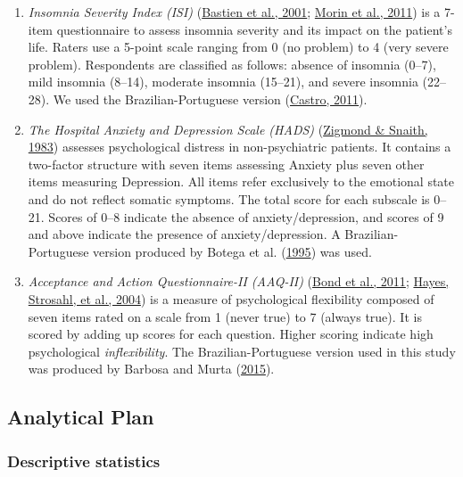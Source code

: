 \documentclass[
  ,doc,11pt, twoside,floatsintext]{apa6}
\begin{document}
\begin{enumerate}
\def\labelenumi{\arabic{enumi}.}
\item
  \emph{Insomnia Severity Index (ISI)} (\protect\hyperlink{ref-bastien2001}{Bastien et al., 2001}; \protect\hyperlink{ref-morin2011a}{Morin et al., 2011}) is a 7-item questionnaire to assess insomnia severity and its impact on the patient's life. Raters use a 5-point scale ranging from 0 (no problem) to 4 (very severe problem). Respondents are classified as follows: absence of insomnia (0--7), mild insomnia (8--14), moderate insomnia (15--21), and severe insomnia (22--28). We used the Brazilian-Portuguese version (\protect\hyperlink{ref-castro}{Castro, 2011}).
\item
  \emph{The Hospital Anxiety and Depression Scale (HADS)} (\protect\hyperlink{ref-zigmond1983hospital}{Zigmond \& Snaith, 1983}) assesses psychological distress in non-psychiatric patients. It contains a two-factor structure with seven items assessing Anxiety plus seven other items measuring Depression. All items refer exclusively to the emotional state and do not reflect somatic symptoms. The total score for each subscale is 0--21. Scores of 0--8 indicate the absence of anxiety/depression, and scores of 9 and above indicate the presence of anxiety/depression. A Brazilian-Portuguese version produced by Botega et al. (\protect\hyperlink{ref-botega1995transtornos}{1995}) was used.
\item
  \emph{Acceptance and Action Questionnaire-II (AAQ-II)} (\protect\hyperlink{ref-bond2011preliminary}{Bond et al., 2011}; \protect\hyperlink{ref-hayes2004measuring}{Hayes, Strosahl, et al., 2004}) is a measure of psychological flexibility composed of seven items rated on a scale from 1 (never true) to 7 (always true). It is scored by adding up scores for each question. Higher scoring indicate high psychological \emph{inflexibility}. The Brazilian-Portuguese version used in this study was produced by Barbosa and Murta (\protect\hyperlink{ref-barbosa2015propriedades}{2015}).
\end{enumerate}

\hypertarget{analytical-plan}{%
\subsection{Analytical Plan}\label{analytical-plan}}

\hypertarget{descriptive-statistics}{%
\subsubsection{Descriptive statistics}\label{descriptive-statistics}}
\end{document}
